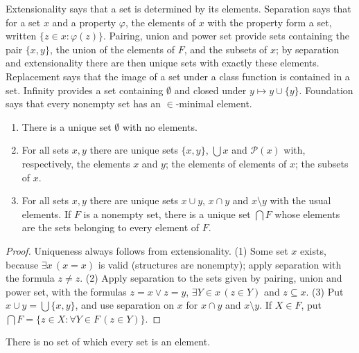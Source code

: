 \begin{remark}\label{sets:remark-axioms-meaning}
Extensionality says that a set is determined by its elements. Separation
says that for a set $x$ and a property $\varphi$, the elements of $x$ with the
property form a set, written $\{z \in x : \varphi(z)\}$. Pairing, union and
power set provide sets containing the pair $\{x, y\}$, the union of the
elements of $F$, and the subsets of $x$; by separation and extensionality
there are then unique sets with exactly these elements. Replacement says that
the image of a set under a class function is contained in a set. Infinity
provides a set containing $\emptyset$ and closed under $y \mapsto y \cup \{y\}$.
Foundation says that every nonempty set has an $\in$-minimal element.
\end{remark}

\begin{lemma}\label{sets:lemma-basic-constructions}
\begin{enumerate}
\item There is a unique set $\emptyset$ with no elements.
\item For all sets $x, y$ there are unique sets $\{x, y\}$, $\bigcup x$ and
$\mathcal{P}(x)$ with, respectively, the elements $x$ and $y$; the elements
of elements of $x$; the subsets of $x$.
\item For all sets $x, y$ there are unique sets $x \cup y$, $x \cap y$ and
$x \setminus y$ with the usual elements. If $F$ is a nonempty set, there is a
unique set $\bigcap F$ whose elements are the sets belonging to every element
of $F$.
\end{enumerate}
\end{lemma}

\begin{proof}
Uniqueness always follows from extensionality. (1) Some set $x$ exists,
because $\exists x\,(x = x)$ is valid (structures are nonempty); apply
separation with the formula $z \neq z$. (2) Apply separation to the sets given
by pairing, union and power set, with the formulas $z = x \vee z = y$,
$\exists Y \in x\,(z \in Y)$ and $z \subseteq x$. (3) Put
$x \cup y = \bigcup\{x, y\}$, and use separation on $x$ for $x \cap y$ and
$x \setminus y$. If $X \in F$, put
$\bigcap F = \{z \in X : \forall Y \in F\, (z \in Y)\}$.
\end{proof}

\begin{proposition}[Russell]\label{sets:proposition-russell}
There is no set of which every set is an element.
\end{proposition}

